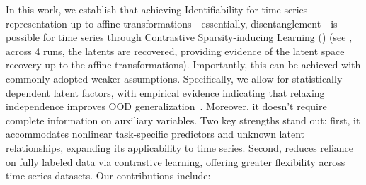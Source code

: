 \documentclass{article} %
\theoremstyle{plain}
\theoremstyle{definition}
\theoremstyle{remark}
\numberwithin{equation}{section}
\begin{document}
In this work, we establish that achieving Identifiability for time series representation up to affine transformations—essentially, disentanglement—is possible for time series through Contrastive Sparsity-inducing Learning (\TimeCSL) (see , across 4 runs, the latents are recovered, providing evidence of the latent space recovery up to the affine transformations). Importantly, this can be achieved with commonly adopted weaker assumptions. Specifically, we allow for statistically dependent latent factors, with empirical evidence indicating that relaxing independence improves OOD generalization~\citep{roth_disentanglement_2023, oublal2024disentangling}. Moreover, it doesn't require complete information on auxiliary variables.  Two key strengths stand out: first, it accommodates nonlinear task-specific predictors and unknown latent relationships, expanding its applicability to time series. Second, \TimeCSL reduces reliance on fully labeled data via contrastive learning, offering greater flexibility across time series datasets. Our contributions include:

\vspace{-0.21cm}
\end{document}
